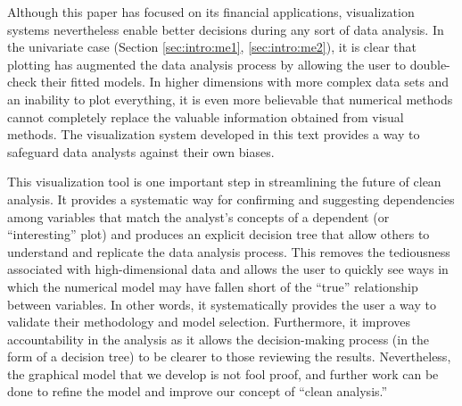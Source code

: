 
Although this paper has focused on its financial applications, visualization systems nevertheless enable better decisions during any sort of data analysis. In the univariate case (Section \ref{sec:intro:me1}, \ref{sec:intro:me2}), it is clear that plotting has augmented the data analysis process by allowing the user to double-check their fitted models. In higher dimensions with more complex data sets and an inability to plot everything, it is even more believable that numerical methods cannot completely replace the valuable information obtained from visual methods. The visualization system developed in this text provides a way to safeguard data analysts against their own biases.

This visualization tool is one important step in streamlining the future of clean analysis. It provides a systematic way for confirming and suggesting dependencies among variables that match the analyst's concepts of a dependent (or ``interesting'' plot) and produces an explicit decision tree that allow others to understand and replicate the data analysis process. This removes the tediousness associated with high-dimensional data and allows the user to quickly see ways in which the numerical model may have fallen short of the ``true'' relationship between variables. In other words, it systematically provides the user a way to validate their methodology and model selection. Furthermore, it improves accountability in the analysis as it allows the decision-making process (in the form of a decision tree) to be clearer to those reviewing the results. Nevertheless, the graphical model that we develop is not fool proof, and further work can be done to refine the model and improve our concept of ``clean analysis.''

